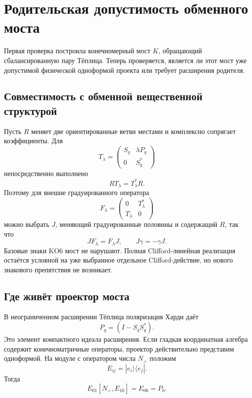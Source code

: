 \chapter{Родительская допустимость обменного моста}

Первая проверка построила конечномерный мост $K$, обращающий сбалансированную
пару Тёплица. Теперь проверяется, является ли этот мост уже допустимой
физической одноформой проекта или требует расширения родителя.

\section{Совместимость с обменной вещественной структурой}

Пусть $R$ меняет две ориентированные ветви местами и комплексно сопрягает
коэффициенты. Для
\begin{equation}
 T_\lambda=
 \begin{pmatrix}S_q&\lambda P_q\\0&S_q^*\end{pmatrix}
\end{equation}
непосредственно выполнено
\begin{equation}
 RT_\lambda=T_\lambda^*R.
 \label{eq:v6-bridge-real-exchange}
\end{equation}
Поэтому для внешне градуированного оператора
\begin{equation}
 F_\lambda=
 \begin{pmatrix}0&T_\lambda^*\\T_\lambda&0\end{pmatrix}
\end{equation}
можно выбрать $J$, меняющий градуированные половины и содержащий $R$, так
что
\begin{equation}
 JF_\lambda=F_\lambda J,
 \qquad J\gamma=-\gamma J.
\end{equation}
Базовые знаки KO6 мост не нарушают. Полная Clifford-линейная реализация
остаётся условной на уже выбранное отдельное Clifford-действие, но нового
знакового препятствия не возникает.

\section{Где живёт проектор моста}

В неограниченном расширении Тёплица поляризация Харди даёт
\begin{equation}
 P_q=(I-S_qS_q^*).
\end{equation}
Это элемент компактного идеала расширения. Если гладкая координатная
алгебра содержит конечноматричные операторы, проектор действительно
представим одноформой. На модуле с оператором числа $N_+$ положим
\begin{equation}
 E_{ij}=|e_i\rangle\langle e_j|.
\end{equation}
Тогда
\begin{equation}
 E_{01}[N_+,E_{10}]=E_{00}=P_0.
 \label{eq:v6-p0-as-compact-oneform}
\end{equation}

